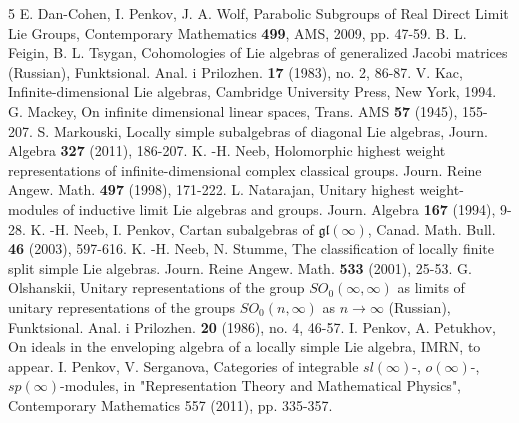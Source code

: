 \documentclass{svmult}
\newcommand{\gl}{\mathfrak{gl}}
\begin{document}
\begin{thebibliography}{5}
\vspace{0.2cm}
 E. Dan-Cohen, I. Penkov, J. A. Wolf, Parabolic Subgroups of Real Direct Limit Lie Groups, Contemporary Mathematics \textbf{499}, AMS, 2009, pp. 47-59.
\vspace{0.2cm}
 B. L. Feigin, B. L. Tsygan, Cohomologies of Lie algebras of generalized Jacobi matrices (Russian), Funktsional. Anal. i Prilozhen. \textbf{17} (1983), no. 2, 86-87.
\vspace{0.2cm}
 V. Kac, Infinite-dimensional Lie algebras, Cambridge University Press, New York, 1994. 
\vspace{0.2cm}
  G. Mackey, On infinite dimensional linear spaces, Trans. AMS \textbf{57} (1945), 155-207.
\vspace{0.2cm}
 S. Markouski, Locally simple subalgebras of diagonal Lie algebras, Journ. Algebra \textbf{327} (2011), 186-207.
\vspace{0.2cm}
 K. -H. Neeb, Holomorphic highest weight representations of infinite-dimensional complex classical groups. Journ. Reine Angew. Math. \textbf{497} (1998), 171-222.
\vspace{0.2cm}
 L. Natarajan, Unitary highest weight-modules of inductive limit Lie algebras and groups. Journ. Algebra \textbf{167} (1994), 9-28.
\vspace{0.2cm}
 K. -H. Neeb, I. Penkov, Cartan subalgebras of $\gl(\infty)$, Canad. Math. Bull. \textbf{46} (2003), 597-616.
\vspace{0.2cm}
 K. -H. Neeb, N. Stumme, The classification of locally finite split simple Lie algebras. Journ. Reine Angew. Math. \textbf{533} (2001), 25-53.
\vspace{0.2cm}
 G. Olshanskii, Unitary representations of the group $SO_0(\infty,\infty)$ as limits of unitary representations of the groups $SO_0(n,\infty)$ as $n \rightarrow \infty$ (Russian), Funktsional. Anal. i Prilozhen. \textbf{20} (1986), no. 4, 46-57.
\vspace{0.2cm}
  I. Penkov, A. Petukhov, On ideals in the enveloping algebra of a locally simple Lie algebra, IMRN, to appear.
\vspace{0.2cm}
 I. Penkov, V. Serganova, Categories of integrable $sl(\infty)$-, $o(\infty)$-, $sp(\infty)$-modules, in "Representation Theory and Mathematical Physics", Contemporary Mathematics 557 (2011), pp. 335-357.
\vspace{0.2cm}

\end{thebibliography}
\end{document}

